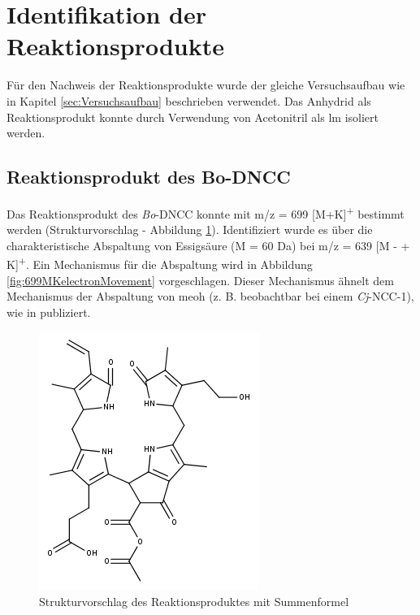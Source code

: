 \section{Identifikation der Reaktionsprodukte} \label{sec:RPMSLeafspray}

Für den Nachweis der Reaktionsprodukte wurde der gleiche Versuchsaufbau wie in Kapitel \ref{sec:Versuchsaufbau} beschrieben verwendet. Das Anhydrid als Reaktionsprodukt konnte durch Verwendung von Acetonitril als \gls{lm} isoliert werden.  

\subsection{Reaktionsprodukt des Bo-DNCC}

Das Reaktionsprodukt des \textit{Bo}-DNCC konnte mit m/z = 699 [M+K]\textsuperscript{+} bestimmt werden (Strukturvorschlag - Abbildung \ref{fig:699MKstructure}). Identifiziert wurde es über die charakteristische Abspaltung von Essigsäure (M = 60 Da) bei m/z = 639 [M -  + K]\textsuperscript{+}. Ein Mechanismus für die Abspaltung wird in Abbildung \ref{fig:699MKelectronMovement} vorgeschlagen. Dieser Mechanismus ähnelt dem Mechanismus der Abspaltung von \gls{meoh} (z. B. beobachtbar bei einem \textit{Cj}-NCC-1), wie in \cite{StructureElucidation} publiziert.\\

\begin{figure}[!htbp]
  \centering
  \includegraphics[scale=0.6]{figures/Kapitel4/Kataboliten/fragmentation_structures/VWA_Katabolit_699.png}
  \caption[Strukturvorschlag des Reaktionsproduktes von \textit{Bo}-DNCC, Quelle: Autor]{Strukturvorschlag des Reaktionsproduktes mit Summenformel }
  \label{fig:699MKstructure}
\end{figure}

